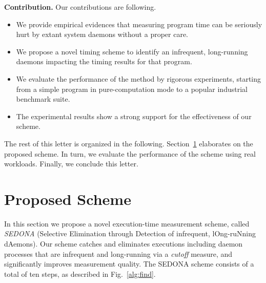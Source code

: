 \documentclass[letter]{ieice}
\begin{document}
{\bf Contribution.} 
Our contributions are following.
\vspace{-0.05in}
\begin{itemize}

\item We provide empirical evidences that 
measuring program time 
can be seriously hurt by extant system daemons 
without a proper care.

\item We propose a novel timing scheme 
to identify an infrequent, long-running daemons impacting the timing results for that program. 

\item We evaluate the performance of the method by rigorous experiments, 
starting from a simple program in pure-computation mode 
to a popular industrial benchmark suite.


\item The experimental results show a strong support for the effectiveness of our scheme. 

\end{itemize}
\vspace{-0.05in}

The rest of this letter is organized in the following. 
Section~\ref{sec:prop_appach} elaborates on the proposed scheme. 
In turn, we evaluate the performance of 
the scheme using real workloads. Finally, we 
conclude this letter.


\section{Proposed Scheme}
\label{sec:prop_appach}

In this section we propose a novel execution-time measurement scheme, 
called {\em SEDONA} (Selective Elimination through Detection of infrequent, lOng-ruNning dAemons). 
Our scheme catches and eliminates executions including daemon processes that are infrequent and 
long-running via a {\em cutoff} measure, and significantly improves measurement quality. 
The SEDONA scheme consists of a total of ten steps, as described in Fig.~\ref{alg:find}. 
\end{document}
